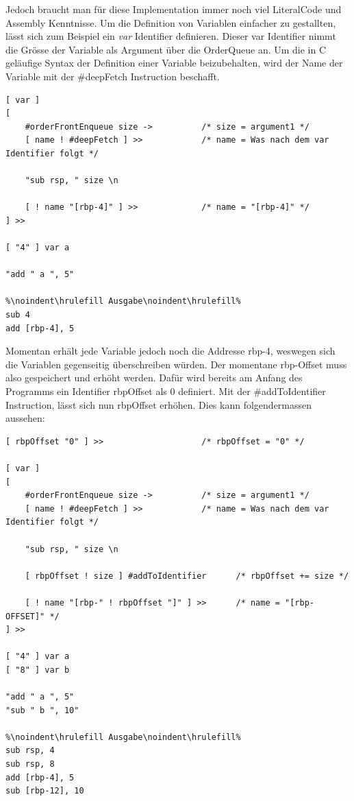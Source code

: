 Jedoch braucht man für diese Implementation immer noch viel LiteralCode und Assembly Kenntnisse. Um die Definition von Variablen einfacher zu gestallten, lässt sich zum Beispiel ein \textit{var} Identifier definieren.
Dieser var Identifier nimmt die Grösse der Variable als Argument über die OrderQueue an. Um die in C geläufige Syntax der Definition einer Variable beizubehalten,
wird der Name der Variable mit der \#deepFetch Instruction beschafft.

\begin{lstlisting}[language=QHS, caption=Definition einer Variable mit \textit{var} Identifier]
[ var ]
[
    #orderFrontEnqueue size ->          /* size = argument1 */
    [ name ! #deepFetch ] >>            /* name = Was nach dem var Identifier folgt */

    "sub rsp, " size \n

    [ ! name "[rbp-4]" ] >>             /* name = "[rbp-4]" */
] >> 

[ "4" ] var a 

"add " a ", 5"
    
%\noindent\hrulefill Ausgabe\noindent\hrulefill%
sub 4
add [rbp-4], 5
\end{lstlisting}

Momentan erhält jede Variable jedoch noch die Addresse rbp-4, weswegen sich die Variablen gegenseitig überschreiben würden. Der momentane rbp-Offset muss also gespeichert und erhöht werden.
Dafür wird bereits am Anfang des Programms ein Identifier rbpOffset als 0 definiert. Mit der \#addToIdentifier Instruction, lässt sich nun rbpOffset erhöhen. Dies kann folgendermassen aussehen:

\begin{minipage}{\linewidth}
\begin{lstlisting}[language=QHS, label=eg:qhs-vardefinition, caption=Definition einer Variable mit rbpOffset]
[ rbpOffset "0" ] >>                    /* rbpOffset = "0" */

[ var ]
[
    #orderFrontEnqueue size ->          /* size = argument1 */
    [ name ! #deepFetch ] >>            /* name = Was nach dem var Identifier folgt */

    "sub rsp, " size \n

    [ rbpOffset ! size ] #addToIdentifier      /* rbpOffset += size */

    [ ! name "[rbp-" ! rbpOffset "]" ] >>      /* name = "[rbp-OFFSET]" */
] >> 

[ "4" ] var a 
[ "8" ] var b 

"add " a ", 5"
"sub " b ", 10"
    
%\noindent\hrulefill Ausgabe\noindent\hrulefill%
sub rsp, 4
sub rsp, 8
add [rbp-4], 5
sub [rbp-12], 10
\end{lstlisting}
\end{minipage}

